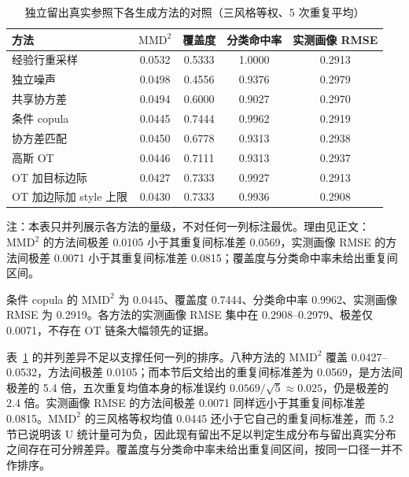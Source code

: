 \documentclass[UTF8,a4paper,zihao=-4]{ctexart}
\numberwithin{figure}{section}
\numberwithin{table}{section}
\numberwithin{equation}{section}
\begin{document}
\begin{table}[H]
  \centering
  \caption{独立留出真实参照下各生成方法的对照（三风格等权、5 次重复平均）}
  \label{tab:q3-res}
  \small
  \begin{tabularx}{\textwidth}{@{}>{\raggedright\arraybackslash}X c c c c@{}}
    \toprule
    方法 & $\mathrm{MMD}^{2}$ & 覆盖度 & 分类命中率 & 实测画像 RMSE \\
    \midrule
    经验行重采样 & 0.0532 & 0.5333 & 1.0000 & 0.2913 \\
    独立噪声 & 0.0498 & 0.4556 & 0.9376 & 0.2979 \\
    共享协方差 & 0.0494 & 0.6000 & 0.9027 & 0.2970 \\
    条件 copula & 0.0445 & 0.7444 & 0.9962 & 0.2919 \\
    协方差匹配 & 0.0450 & 0.6778 & 0.9313 & 0.2938 \\
    高斯 OT & 0.0446 & 0.7111 & 0.9313 & 0.2937 \\
    OT 加目标边际 & 0.0427 & 0.7333 & 0.9927 & 0.2913 \\
    OT 加边际加 style 上限 & 0.0430 & 0.7333 & 0.9936 & 0.2908 \\
    \bottomrule
  \end{tabularx}
  \par\vspace{3pt}
  \begin{minipage}{\textwidth}
    \footnotesize 注：本表只并列展示各方法的量级，不对任何一列标注最优。理由见正文：$\mathrm{MMD}^{2}$ 的方法间极差 0.0105 小于其重复间标准差 0.0569，实测画像 RMSE 的方法间极差 0.0071 小于其重复间标准差 0.0815；覆盖度与分类命中率未给出重复间区间。
  \end{minipage}
\end{table}

条件 copula 的 $\mathrm{MMD}^{2}$ 为 0.0445、覆盖度 0.7444、分类命中率 0.9962、实测画像 RMSE 为 0.2919。各方法的实测画像 RMSE 集中在 0.2908--0.2979、极差仅 0.0071，不存在 OT 链条大幅领先的证据。

表~\ref{tab:q3-res} 的并列差异不足以支撑任何一列的排序。八种方法的 $\mathrm{MMD}^{2}$ 覆盖 0.0427--0.0532，方法间极差 0.0105；而本节后文给出的重复间标准差为 0.0569，是方法间极差的 5.4 倍，五次重复均值本身的标准误约 $0.0569/\sqrt{5}\approx0.025$，仍是极差的 2.4 倍。实测画像 RMSE 的方法间极差 0.0071 同样远小于其重复间标准差 0.0815。$\mathrm{MMD}^{2}$ 的三风格等权均值 0.0445 还小于它自己的重复间标准差，而 5.2 节已说明该 U 统计量可为负，因此现有留出不足以判定生成分布与留出真实分布之间存在可分辨差异。覆盖度与分类命中率未给出重复间区间，按同一口径一并不作排序。
\end{document}

